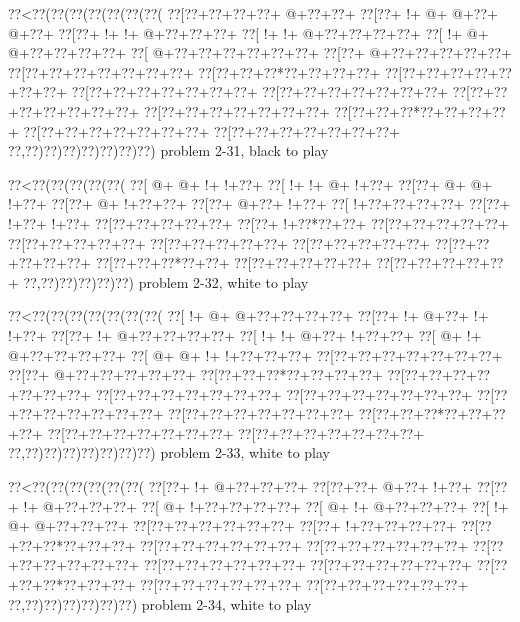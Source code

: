 \vbox{\vbox{\goo
\0??<\0??(\0??(\0??(\0??(\0??(\0??(\0??(
\0??[\0??+\0??+\0??+\0??+\- @+\0??+\0??+
\0??[\0??+\- !+\- @+\- @+\0??+\- @+\0??+
\0??[\0??+\- !+\- !+\- @+\0??+\0??+\0??+
\0??[\- !+\- !+\- @+\0??+\0??+\0??+\0??+
\0??[\- !+\- @+\- @+\0??+\0??+\0??+\0??+
\0??[\- @+\0??+\0??+\0??+\0??+\0??+\0??+
\0??[\0??+\- @+\0??+\0??+\0??+\0??+\0??+
\0??[\0??+\0??+\0??+\0??+\0??+\0??+\0??+
\0??[\0??+\0??+\0??*\0??+\0??+\0??+\0??+
\0??[\0??+\0??+\0??+\0??+\0??+\0??+\0??+
\0??[\0??+\0??+\0??+\0??+\0??+\0??+\0??+
\0??[\0??+\0??+\0??+\0??+\0??+\0??+\0??+
\0??[\0??+\0??+\0??+\0??+\0??+\0??+\0??+
\0??[\0??+\0??+\0??+\0??+\0??+\0??+\0??+
\0??[\0??+\0??+\0??*\0??+\0??+\0??+\0??+
\0??[\0??+\0??+\0??+\0??+\0??+\0??+\0??+
\0??[\0??+\0??+\0??+\0??+\0??+\0??+\0??+
\0??,\0??)\0??)\0??)\0??)\0??)\0??)\0??)
}
\hfil problem 2-31, black to play\hfil\break
}

\vbox{\vbox{\goo
\0??<\0??(\0??(\0??(\0??(\0??(
\0??[\- @+\- @+\- !+\- !+\0??+
\0??[\- !+\- !+\- @+\- !+\0??+
\0??[\0??+\- @+\- @+\- !+\0??+
\0??[\0??+\- @+\- !+\0??+\0??+
\0??[\0??+\- @+\0??+\- !+\0??+
\0??[\- !+\0??+\0??+\0??+\0??+
\0??[\0??+\- !+\0??+\- !+\0??+
\0??[\0??+\0??+\0??+\0??+\0??+
\0??[\0??+\- !+\0??*\0??+\0??+
\0??[\0??+\0??+\0??+\0??+\0??+
\0??[\0??+\0??+\0??+\0??+\0??+
\0??[\0??+\0??+\0??+\0??+\0??+
\0??[\0??+\0??+\0??+\0??+\0??+
\0??[\0??+\0??+\0??+\0??+\0??+
\0??[\0??+\0??+\0??*\0??+\0??+
\0??[\0??+\0??+\0??+\0??+\0??+
\0??[\0??+\0??+\0??+\0??+\0??+
\0??,\0??)\0??)\0??)\0??)\0??)
}
\hfil problem 2-32, white to play\hfil\break
}

\vbox{\vbox{\goo
\0??<\0??(\0??(\0??(\0??(\0??(\0??(\0??(
\0??[\- !+\- @+\- @+\0??+\0??+\0??+\0??+
\0??[\0??+\- !+\- @+\0??+\- !+\- !+\0??+
\0??[\0??+\- !+\- @+\0??+\0??+\0??+\0??+
\0??[\- !+\- !+\- @+\0??+\- !+\0??+\0??+
\0??[\- @+\- !+\- @+\0??+\0??+\0??+\0??+
\0??[\- @+\- @+\- !+\- !+\0??+\0??+\0??+
\0??[\0??+\0??+\0??+\0??+\0??+\0??+\0??+
\0??[\0??+\- @+\0??+\0??+\0??+\0??+\0??+
\0??[\0??+\0??+\0??*\0??+\0??+\0??+\0??+
\0??[\0??+\0??+\0??+\0??+\0??+\0??+\0??+
\0??[\0??+\0??+\0??+\0??+\0??+\0??+\0??+
\0??[\0??+\0??+\0??+\0??+\0??+\0??+\0??+
\0??[\0??+\0??+\0??+\0??+\0??+\0??+\0??+
\0??[\0??+\0??+\0??+\0??+\0??+\0??+\0??+
\0??[\0??+\0??+\0??*\0??+\0??+\0??+\0??+
\0??[\0??+\0??+\0??+\0??+\0??+\0??+\0??+
\0??[\0??+\0??+\0??+\0??+\0??+\0??+\0??+
\0??,\0??)\0??)\0??)\0??)\0??)\0??)\0??)
}
\hfil problem 2-33, white to play\hfil\break
}

\vbox{\vbox{\goo
\0??<\0??(\0??(\0??(\0??(\0??(\0??(
\0??[\0??+\- !+\- @+\0??+\0??+\0??+
\0??[\0??+\0??+\- @+\0??+\- !+\0??+
\0??[\0??+\- !+\- @+\0??+\0??+\0??+
\0??[\- @+\- !+\0??+\0??+\0??+\0??+
\0??[\- @+\- !+\- @+\0??+\0??+\0??+
\0??[\- !+\- @+\- @+\0??+\0??+\0??+
\0??[\0??+\0??+\0??+\0??+\0??+\0??+
\0??[\0??+\- !+\0??+\0??+\0??+\0??+
\0??[\0??+\0??+\0??*\0??+\0??+\0??+
\0??[\0??+\0??+\0??+\0??+\0??+\0??+
\0??[\0??+\0??+\0??+\0??+\0??+\0??+
\0??[\0??+\0??+\0??+\0??+\0??+\0??+
\0??[\0??+\0??+\0??+\0??+\0??+\0??+
\0??[\0??+\0??+\0??+\0??+\0??+\0??+
\0??[\0??+\0??+\0??*\0??+\0??+\0??+
\0??[\0??+\0??+\0??+\0??+\0??+\0??+
\0??[\0??+\0??+\0??+\0??+\0??+\0??+
\0??,\0??)\0??)\0??)\0??)\0??)\0??)
}
\hfil problem 2-34, white to play\hfil\break
}

